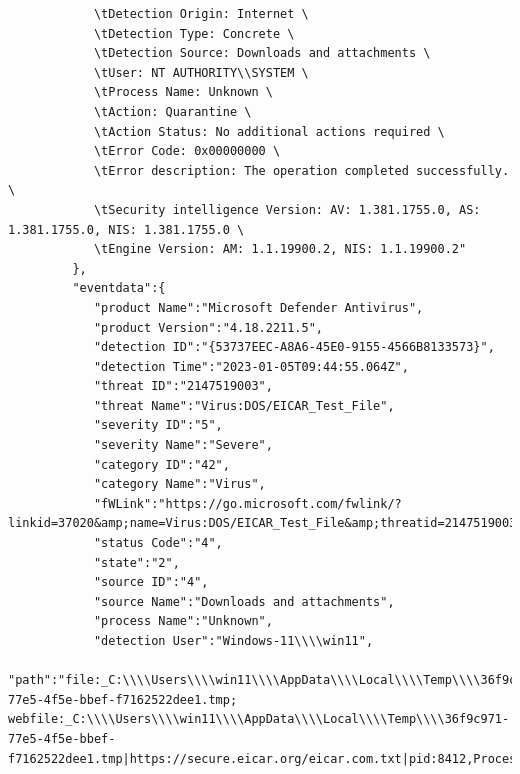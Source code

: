 \begin{itemize}
\begin{verbatim}
            \tDetection Origin: Internet \
            \tDetection Type: Concrete \
            \tDetection Source: Downloads and attachments \
            \tUser: NT AUTHORITY\\SYSTEM \
            \tProcess Name: Unknown \
            \tAction: Quarantine \
            \tAction Status: No additional actions required \
            \tError Code: 0x00000000 \
            \tError description: The operation completed successfully. \
            \tSecurity intelligence Version: AV: 1.381.1755.0, AS: 1.381.1755.0, NIS: 1.381.1755.0 \
            \tEngine Version: AM: 1.1.19900.2, NIS: 1.1.19900.2"
         },
         "eventdata":{
            "product Name":"Microsoft Defender Antivirus",
            "product Version":"4.18.2211.5",
            "detection ID":"{53737EEC-A8A6-45E0-9155-4566B8133573}",
            "detection Time":"2023-01-05T09:44:55.064Z",
            "threat ID":"2147519003",
            "threat Name":"Virus:DOS/EICAR_Test_File",
            "severity ID":"5",
            "severity Name":"Severe",
            "category ID":"42",
            "category Name":"Virus",
            "fWLink":"https://go.microsoft.com/fwlink/?linkid=37020&amp;name=Virus:DOS/EICAR_Test_File&amp;threatid=2147519003&amp;enterprise=0",
            "status Code":"4",
            "state":"2",
            "source ID":"4",
            "source Name":"Downloads and attachments",
            "process Name":"Unknown",
            "detection User":"Windows-11\\\\win11",
            "path":"file:_C:\\\\Users\\\\win11\\\\AppData\\\\Local\\\\Temp\\\\36f9c971-77e5-4f5e-bbef-f7162522dee1.tmp; webfile:_C:\\\\Users\\\\win11\\\\AppData\\\\Local\\\\Temp\\\\36f9c971-77e5-4f5e-bbef-f7162522dee1.tmp|https://secure.eicar.org/eicar.com.txt|pid:8412,ProcessStart:133173854939240064",

\end{verbatim}
\end{itemize}
